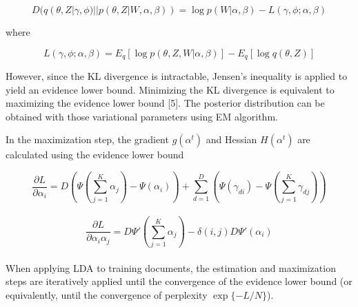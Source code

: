 \documentclass{article} %
\begin{document}
\begin{equation*}
D(q(\theta,Z|\gamma,\phi)||p(\theta,Z|W,\alpha,\beta)) = \log p(W|\alpha,\beta) - L(\gamma,\phi;\alpha,\beta)
\end{equation*}

where

\begin{equation*}
L(\gamma,\phi;\alpha,\beta) =E_q[\log p(\theta,Z,W|\alpha,\beta)] - E_q[\log q(\theta,Z)]
\end{equation*}

However, since the KL divergence is intractable, Jensen's inequality is applied to yield an evidence lower bound. Minimizing the KL divergence is equivalent to maximizing the evidence lower bound [5]. The posterior distribution can be obtained with those variational parameters using EM algorithm.

In the maximization step, the gradient $g(\alpha^{t})$ and Hessian $H(\alpha^{t})$ are calculated using the evidence lower bound

$$\frac{\partial L}{\partial \alpha_i} = D(\Psi (\sum_{j=1}^{K}\alpha_j)-\Psi(\alpha_i)) + \sum_{d=1}^{D}(\Psi(\gamma_{di}) -\Psi(\sum_{j=1}^{K}\gamma_{dj}))$$\\
$$\frac{\partial L}{\partial \alpha_i \alpha_j} = D\Psi'(\sum_{j=1}^{K}\alpha_j) - \delta (i,j)D\Psi'(\alpha_i)$$\\


When applying LDA to training documents, the estimation and maximization steps are iteratively applied until the convergence of the evidence lower bound (or equivalently, until the convergence of perplexity $\exp\{-L/N\}$).
\end{document}
